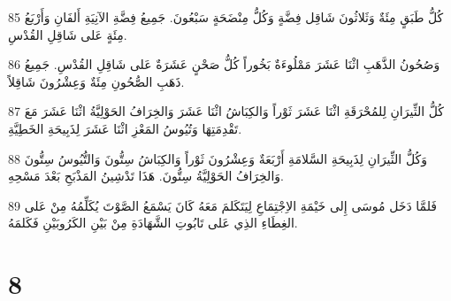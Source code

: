\par 85 كُلُّ طَبَقٍ مِئَةٌ وَثَلاثُونَ شَاقِل فِضَّةٍ وَكُلُّ مِنْضَحَةٍ سَبْعُونَ. جَمِيعُ فِضَّةِ الآنِيَةِ أَلفَانِ وَأَرْبَعُ مِئَةٍ عَلى شَاقِلِ القُدْسِ.
\par 86 وَصُحُونُ الذَّهَبِ اثْنَا عَشَرَ مَمْلُوءَةٌ بَخُوراً كُلُّ صَحْنٍ عَشَرَةٌ عَلى شَاقِلِ القُدْسِ. جَمِيعُ ذَهَبِ الصُّحُونِ مِئَةٌ وَعِشْرُونَ شَاقِلاً.
\par 87 كُلُّ الثِّيرَانِ لِلمُحْرَقَةِ اثْنَا عَشَرَ ثَوْراً وَالكِبَاشُ اثْنَا عَشَرَ وَالخِرَافُ الحَوْلِيَّةُ اثْنَا عَشَرَ مَعَ تَقْدِمَتِهَا وَتُيُوسُ المَعْزِ اثْنَا عَشَرَ لِذَبِيحَةِ الخَطِيَّةِ.
\par 88 وَكُلُّ الثِّيرَانِ لِذَبِيحَةِ السَّلامَةِ أَرْبَعَةٌ وَعِشْرُونَ ثَوْراً وَالكِبَاشُ سِتُّونَ وَالتُّيُوسُ سِتُّونَ وَالخِرَافُ الحَوْلِيَّةُ سِتُّونَ. هَذَا تَدْشِينُ المَذْبَحِ بَعْدَ مَسْحِهِ.
\par 89 فَلمَّا دَخَل مُوسَى إِلى خَيْمَةِ الاِجْتِمَاعِ لِيَتَكَلمَ مَعَهُ كَانَ يَسْمَعُ الصَّوْتَ يُكَلِّمُهُ مِنْ عَلى الغِطَاءِ الذِي عَلى تَابُوتِ الشَّهَادَةِ مِنْ بَيْنِ الكَرُوبَيْنِ فَكَلمَهُ.

\chapter{8}

